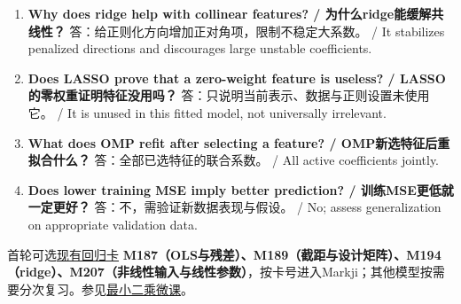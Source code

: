 \begin{enumerate}[start=1]

\item \textbf{Why does ridge help with collinear features? / 为什么ridge能缓解共线性？} 答：给正则化方向增加正对角项，限制不稳定大系数。 / It stabilizes penalized directions and discourages large unstable coefficients.

\item \textbf{Does LASSO prove that a zero-weight feature is useless? / LASSO的零权重证明特征没用吗？} 答：只说明当前表示、数据与正则设置未使用它。 / It is unused in this fitted model, not universally irrelevant.

\item \textbf{What does OMP refit after selecting a feature? / OMP新选特征后重拟合什么？} 答：全部已选特征的联合系数。 / All active coefficients jointly.

\item \textbf{Does lower training MSE imply better prediction? / 训练MSE更低就一定更好？} 答：不，需验证新数据表现与假设。 / No; assess generalization on appropriate validation data.

\end{enumerate}


首轮可选\href{https://crazyshout.github.io/micro-course/cards.html\#CS5489-M187}{现有回归卡} \textbf{M187（OLS与残差）、M189（截距与设计矩阵）、M194（ridge）、M207（非线性输入与线性参数）}，按卡号进入Markji；其他模型按需要分次复习。参见\href{https://crazyshout.github.io/micro-course/?lesson=ml19}{最小二乘微课}。



